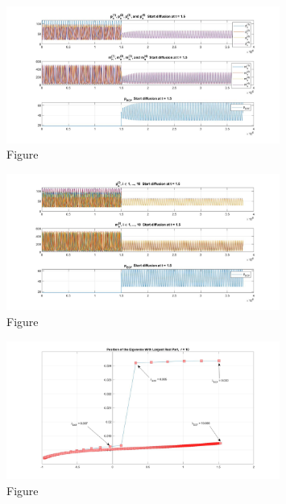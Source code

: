 \documentclass[12pt]{article}
\renewcommand{\(}{\left (}
\renewcommand{\)}{\right )}
\begin{document}
\begin{figure}[ht]
    \centering
	\begin{minipage}{0.99\textwidth}
		\centering
		\includegraphics[width=0.8\textwidth]{UU_M.jpg}
		\caption*{\small Figure}
	\end{minipage}
\end{figure}

\begin{figure}[ht]
    \centering
	\begin{minipage}{0.99\textwidth}
		\centering
		\includegraphics[width=0.8\textwidth]{UU_10.jpg}
		\caption*{\small Figure}
	\end{minipage}
\end{figure}

\begin{figure}[ht]
    \centering
	\begin{minipage}{0.99\textwidth}
		\centering
		\includegraphics[width=0.8\textwidth]{all_lambda_Ei.jpg}
		\caption*{\small Figure}
	\end{minipage}
\end{figure}
\end{document}
